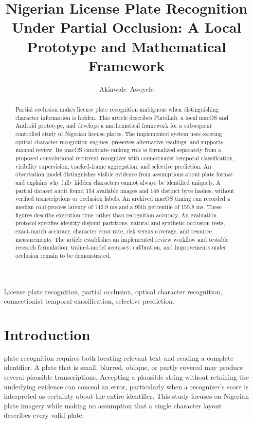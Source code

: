 \documentclass[journal]{IEEEtran}
\begin{document}
\title{Nigerian License Plate Recognition Under Partial Occlusion: A Local Prototype and Mathematical Framework}
\author{Akinwale~Awoyele}
\maketitle

\begin{abstract}
Partial occlusion makes license plate recognition ambiguous when distinguishing character information is hidden. This article describes PlateLab, a local macOS and Android prototype, and develops a mathematical framework for a subsequent controlled study of Nigerian license plates. The implemented system uses existing optical character recognition engines, preserves alternative readings, and supports manual review. Its macOS candidate-ranking rule is formalized separately from a proposed convolutional recurrent recognizer with connectionist temporal classification, visibility supervision, tracked-frame aggregation, and selective prediction. An observation model distinguishes visible evidence from assumptions about plate format and explains why fully hidden characters cannot always be identified uniquely. A partial dataset audit found 154 available images and 148 distinct byte hashes, without verified transcriptions or occlusion labels. An archived macOS timing run recorded a median cold-process latency of 142.9 ms and a 95th percentile of 155.8 ms. These figures describe execution time rather than recognition accuracy. An evaluation protocol specifies identity-disjoint partitions, natural and synthetic occlusion tests, exact-match accuracy, character error rate, risk versus coverage, and resource measurements. The article establishes an implemented review workflow and testable research formulation; trained-model accuracy, calibration, and improvements under occlusion remain to be demonstrated.
\end{abstract}

\begin{IEEEkeywords}
License plate recognition, partial occlusion, optical character recognition, connectionist temporal classification, selective prediction.
\end{IEEEkeywords}

\section{Introduction}
 plate recognition requires both locating relevant text and reading a complete identifier. A plate that is small, blurred, oblique, or partly covered may produce several plausible transcriptions. Accepting a plausible string without retaining the underlying evidence can conceal an error, particularly when a recognizer's score is interpreted as certainty about the entire identifier. This study focuses on Nigerian plate imagery while making no assumption that a single character layout describes every valid plate.
\end{document}
